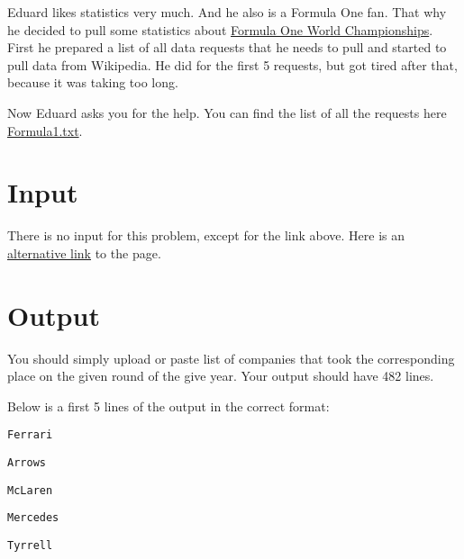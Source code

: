 Eduard likes statistics very much.
And he also is a Formula One fan.
That why he decided to pull some statistics about \href{https://en.wikipedia.org/wiki/Formula_One_World_Champions}{Formula One World Championships}.
First he prepared a list of all data requests that he needs to pull and started to pull data from Wikipedia.
He did for the first 5 requests, but got tired after that, because it was taking too long.

Now Eduard asks you for the help.
You can find the list of all the requests here \href{http://ejudge.rau.am/ejudge/formula1.txt}{Formula1.txt}.

\section*{Input}
There is no input for this problem, except for the link above.
Here is an \href{http://167.71.248.201/ejudge/formla1.txt}{alternative link} to the page.

\section*{Output}
You should simply upload or paste list of companies that took the corresponding place on the given round of the give year.
Your output should have 482 lines.

Below is a first 5 lines of the output in the correct format:
\begin{center}
    \texttt{Ferrari}

    \texttt{Arrows}
    
    \texttt{McLaren}
    
    \texttt{Mercedes}
    
    \texttt{Tyrrell}
\end{center}

